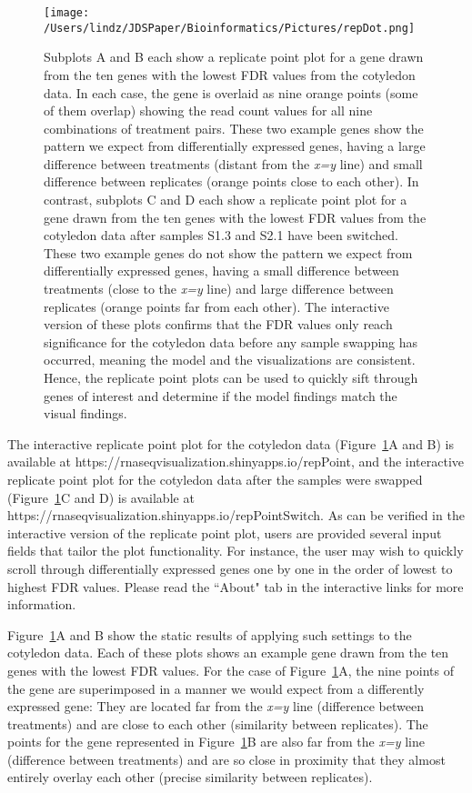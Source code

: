 \documentclass[referee]{biom}
\begin{document}
\begin{figure}
\begin{center}
\centerline{\texttt{[image: /Users/lindz/JDSPaper/Bioinformatics/Pictures/repDot.png]}}
\end{center}
\caption{Subplots A and B each show a replicate point plot for a gene drawn from the ten genes with the lowest FDR values from the cotyledon data. In each case, the gene is overlaid as nine orange points (some of them overlap) showing the read count values for all nine combinations of treatment pairs. These two example genes show the pattern we expect from differentially expressed genes, having a large difference between treatments (distant from the \textit{x=y} line) and small difference between replicates (orange points close to each other). In contrast, subplots C and D each show a replicate point plot for a gene drawn from the ten genes with the lowest FDR values from the cotyledon data after samples S1.3 and S2.1 have been switched. These two example genes do not show the pattern we expect from differentially expressed genes, having a small difference between treatments (close to the \textit{x=y} line) and large difference between replicates (orange points far from each other). The interactive version of these plots confirms that the FDR values only reach significance for the cotyledon data before any sample swapping has occurred, meaning the model and the visualizations are consistent. Hence, the replicate point plots can be used to quickly sift through genes of interest and determine if the model findings match the visual findings.
\label{repDot}}
\end{figure}

The interactive replicate point plot for the cotyledon data (Figure~\ref{repDot}A and B) is available at https://rnaseqvisualization.shinyapps.io/repPoint, and the interactive replicate point plot for the cotyledon data after the samples were swapped (Figure~\ref{repDot}C and D) is available at https://rnaseqvisualization.shinyapps.io/repPointSwitch. As can be verified in the interactive version of the replicate point plot, users are provided several input fields that tailor the plot functionality. For instance, the user may wish to quickly scroll through differentially expressed genes one by one in the order of lowest to highest FDR values. Please read the ``About" tab in the interactive links for more information.

Figure~\ref{repDot}A and B show the static results of applying such settings to the cotyledon data. Each of these plots shows an example gene drawn from the ten genes with the lowest FDR values. For the case of Figure~\ref{repDot}A, the nine points of the gene are superimposed in a manner we would expect from a differently expressed gene: They are located far from the \textit{x=y} line (difference between treatments) and are close to each other (similarity between replicates). The points for the gene represented in Figure~\ref{repDot}B are also far from the \textit{x=y} line (difference between treatments) and are so close in proximity that they almost entirely overlay each other (precise similarity between replicates).
\end{document}
